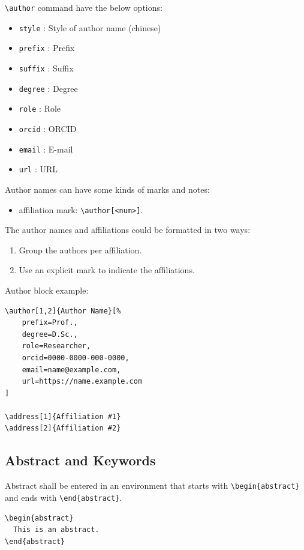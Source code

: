 \documentclass[
]{ceurart}
\begin{document}
\verb|\author| command have the below options: 

\begin{itemize}
\item \verb|style| : Style of author name (chinese)
\item \verb|prefix| : Prefix
\item \verb|suffix| : Suffix
\item \verb|degree| : Degree
\item \verb|role| : Role
\item \verb|orcid| : ORCID
\item \verb|email| : E-mail
\item \verb|url| : URL
\end{itemize}

Author names can have some kinds of marks and notes:
\begin{itemize}
\item affiliation mark: \verb|\author[<num>]|.
\end{itemize}

The author names and affiliations could be formatted in two ways:
\begin{enumerate}
\item Group the authors per affiliation.
\item Use an explicit mark to indicate the affiliations.
\end{enumerate}

Author block example:
\begin{lstlisting}
\author[1,2]{Author Name}[%
    prefix=Prof.,
    degree=D.Sc.,
    role=Researcher,
    orcid=0000-0000-000-0000,
    email=name@example.com,
    url=https://name.example.com
]

\address[1]{Affiliation #1}
\address[2]{Affiliation #2}
\end{lstlisting}

\subsection{Abstract and Keywords}

Abstract shall be entered in an environment that starts
with \verb|\begin{abstract}| and ends with
\verb|\end{abstract}|. 

\begin{lstlisting}
\begin{abstract}
  This is an abstract.
\end{abstract}
\end{lstlisting}
\end{document}
